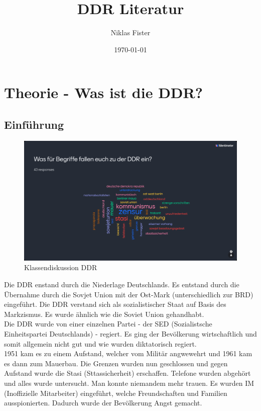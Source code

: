 \documentclass{article}
\title{\huge\textbf{DDR Literatur}}
\author{Niklas Fister}
\date{\today}
\begin{document}
\maketitle

\newpage
\section{Theorie - Was ist die DDR?}
\subsection{Einführung}
\begin{figure}[h]
    \centering
    \includegraphics[width=0.5\linewidth]{resources/images/Was_ist_DDR.png}
    \caption{Klassendiskussion DDR}
    \label{fig:Mentimeter}
\end{figure}
Die DDR enstand durch die Niederlage Deutschlands. Es entstand durch die Übernahme durch die Sovjet Union mit der Ost-Mark (unterschiedlich zur BRD) eingeführt. Die DDR verstand sich als sozialistischer Staat auf Basis des Markzismus. Es wurde ähnlich wie die Soviet Union gehandhabt. \\
Die DDR wurde von einer einzelnen Partei - der SED (Sozialistsche Einheitspartei Deutschlands) - regiert. Es ging der Bevölkerung wirtschaftlich und somit allgemein nicht gut und wie wurden diktatorisch regiert. \\
1951 kam es zu einem Aufstand, welcher vom Militär angwewehrt und 1961 kam es dann zum Mauerbau. Die Grenzen wurden nun geschlossen und gegen Aufstand wurde die Stasi (Sttassicherheit) erschaffen. Telefone wurden abgehört und alles wurde untersucht. Man konnte niemandem mehr trauen. Es wurden IM (Inoffizielle Mitarbeiter) eingeführt, welche Freundschaften und Familien ausspionierten. Dadurch wurde der Bevölkerung Angst gemacht.
\end{document}
